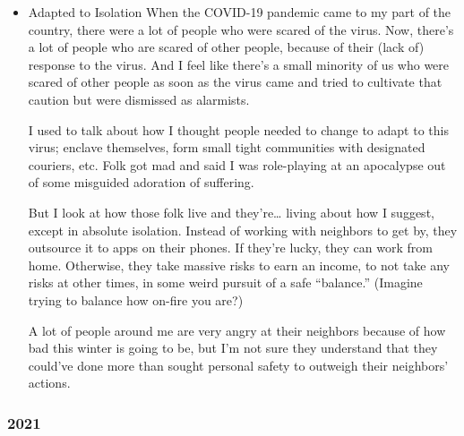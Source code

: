 \documentclass[11pt]{article}
\begin{document}
\begin{itemize}
\item Adapted to Isolation
\label{sec:org2ea10b3}
When the COVID-19 pandemic came to my part of the country, there were a lot of people who were scared of the virus. Now, there’s a lot of people who are scared of other people, because of their (lack of) response to the virus. And I feel like there’s a small minority of us who were scared of other people as soon as the virus came and tried to cultivate that caution but were dismissed as alarmists.

I used to talk about how I thought people needed to change to adapt to this virus; enclave themselves, form small tight communities with designated couriers, etc. Folk got mad and said I was role-playing at an apocalypse out of some misguided adoration of suffering.

But I look at how those folk live and they’re… living about how I suggest, except in absolute isolation. Instead of working with neighbors to get by, they outsource it to apps on their phones. If they’re lucky, they can work from home. Otherwise, they take massive risks to earn an income, to not take any risks at other times, in some weird pursuit of a safe “balance.” (Imagine trying to balance how on-fire you are?)

A lot of people around me are very angry at their neighbors because of how bad this winter is going to be, but I’m not sure they understand that they could’ve done more than sought personal safety to outweigh their neighbors’ actions.
\end{itemize}
\stopcontents[level-4]
\stopcontents[level-3]
\subsubsection*{2021}
\label{sec:orga50ad56}
\startcontents[level-3]
\end{document}
